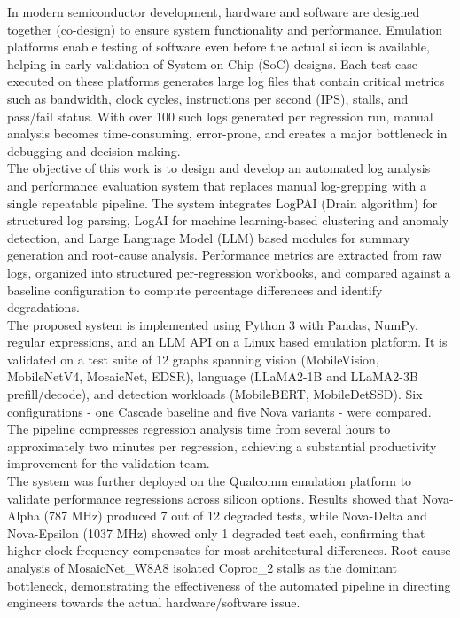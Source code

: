 \vspace{-1cm}


In modern semiconductor development, hardware and software are designed together (co-design) to ensure system functionality and performance. Emulation platforms enable testing of software even before the actual silicon is available, helping in early validation of System-on-Chip (SoC) designs. Each test case executed on these platforms generates large log files that contain critical metrics such as bandwidth, clock cycles, instructions per second (IPS), stalls, and pass/fail status. With over 100 such logs generated per regression run, manual analysis becomes time-consuming, error-prone, and creates a major bottleneck in debugging and decision-making.\\

The objective of this work is to design and develop an automated log analysis and performance evaluation system that replaces manual log-grepping with a single repeatable pipeline. The system integrates LogPAI (Drain algorithm) for structured log parsing, LogAI for machine learning-based clustering and anomaly detection, and Large Language Model (LLM) based modules for summary generation and root-cause analysis. Performance metrics are extracted from raw logs, organized into structured per-regression workbooks, and compared against a baseline configuration to compute percentage differences and identify degradations.\\

The proposed system is implemented using Python 3 with Pandas, NumPy, regular expressions, and an LLM API on a Linux based emulation platform. It is validated on a test suite of 12 graphs spanning vision (MobileVision, MobileNetV4, MosaicNet, EDSR), language (LLaMA2-1B and LLaMA2-3B prefill/decode), and detection workloads (MobileBERT, MobileDetSSD). Six configurations - one Cascade baseline and five Nova variants - were compared. The pipeline compresses regression analysis time from several hours to approximately two minutes per regression, achieving a substantial productivity improvement for the validation team.\\

The system was further deployed on the Qualcomm emulation platform to validate performance regressions across silicon options. Results showed that Nova-Alpha (787 MHz) produced 7 out of 12 degraded tests, while Nova-Delta and Nova-Epsilon (1037 MHz) showed only 1 degraded test each, confirming that higher clock frequency compensates for most architectural differences. Root-cause analysis of MosaicNet\_W8A8 isolated Coproc\_2 stalls as the dominant bottleneck, demonstrating the effectiveness of the automated pipeline in directing engineers towards the actual hardware/software issue.

\pagebreak
